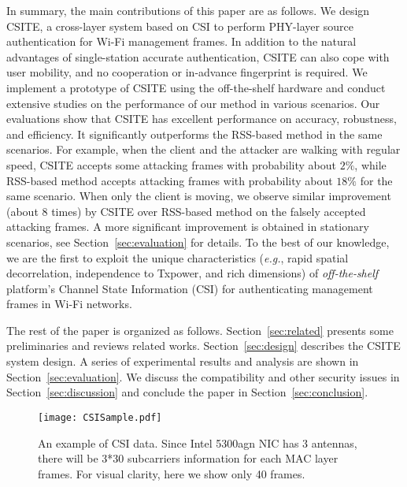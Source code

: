 \documentclass[conference]{IEEEtran}
\def\eg{\textit{e.g.}\xspace}
\begin{document}
In summary, the main contributions of this paper are as follows.
We design CSITE, a cross-layer system based on CSI to perform
  PHY-layer source authentication for Wi-Fi management frames.
In addition to  the natural advantages of single-station accurate
 authentication,   CSITE can also cope with user mobility, and no
 cooperation or in-advance fingerprint is required.
We implement a prototype of CSITE using the off-the-shelf hardware and
 conduct extensive studies on the performance of our method in various
 scenarios.
Our evaluations show  that CSITE has excellent performance on
 accuracy, robustness, and efficiency.
It significantly outperforms the RSS-based method in the same
scenarios.
For example, when the client  and the attacker are
 walking with regular speed, CSITE
 accepts  some attacking frames with probability about $2\%$, while
 RSS-based method accepts attacking frames with probability about
 $18\%$ for the same scenario.
When only the client is moving, we observe similar improvement (about
 $8$ times) by CSITE over RSS-based method on the falsely accepted
 attacking frames.
A more significant improvement is obtained in stationary scenarios, see Section~\ref{sec:evaluation} for details.
To the best of our knowledge,
 we are the first to exploit the unique characteristics (\eg, rapid spatial
  decorrelation, independence to Txpower, and rich dimensions)
  of \emph{off-the-shelf} platform's Channel State Information (CSI)
  for authenticating management frames in Wi-Fi networks.

The rest of the paper is organized as follows.
Section~\ref{sec:related} presents some preliminaries and reviews
related works.
Section~\ref{sec:design} describes the CSITE system design.
A series of experimental results
 and analysis are shown in Section~\ref{sec:evaluation}.
We discuss the compatibility and other security issues in
Section~\ref{sec:discussion} and conclude the paper in
Section~\ref{sec:conclusion}.


\begin{figure}[t]
\begin{center}
\texttt{[image: CSISample.pdf]}

\caption{An example of CSI data. Since Intel 5300agn NIC has 3
  antennas, there will be 3*30 subcarriers information for each MAC
  layer frames.  For visual clarity, here we show only 40
  frames. }
\label{fig:csisample}
\end{center}
\vspace{-0.1in}
\end{figure}
\end{document}
